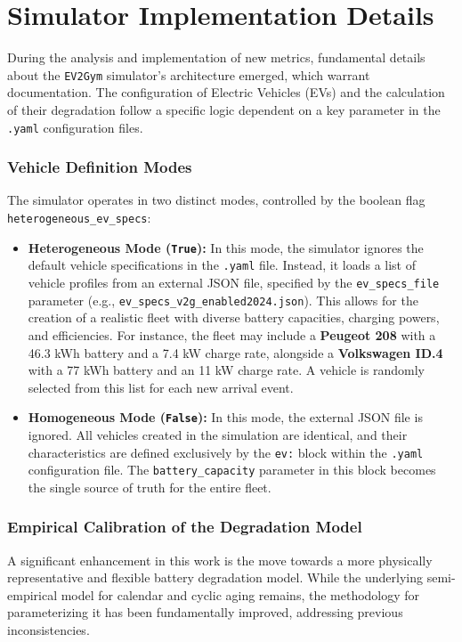 \section{Simulator Implementation Details}
\label{sec:sim_architecture}
During the analysis and implementation of new metrics, fundamental details about the \texttt{EV2Gym} simulator's architecture emerged, which warrant documentation. The configuration of Electric Vehicles (EVs) and the calculation of their degradation follow a specific logic dependent on a key parameter in the \texttt{.yaml} configuration files.

\subsubsection{Vehicle Definition Modes}
The simulator operates in two distinct modes, controlled by the boolean flag \texttt{heterogeneous\_ev\_specs}:
\begin{itemize}
    \item \textbf{Heterogeneous Mode (\texttt{True}):} In this mode, the simulator ignores the default vehicle specifications in the \texttt{.yaml} file. Instead, it loads a list of vehicle profiles from an external JSON file, specified by the \texttt{ev\_specs\_file} parameter (e.g., \texttt{ev\_specs\_v2g\_enabled2024.json}). This allows for the creation of a realistic fleet with diverse battery capacities, charging powers, and efficiencies. For instance, the fleet may include a \textbf{Peugeot 208} with a 46.3 kWh battery and a 7.4 kW charge rate, alongside a \textbf{Volkswagen ID.4} with a 77 kWh battery and an 11 kW charge rate. A vehicle is randomly selected from this list for each new arrival event.
    \item \textbf{Homogeneous Mode (\texttt{False}):} In this mode, the external JSON file is ignored. All vehicles created in the simulation are identical, and their characteristics are defined exclusively by the \texttt{ev:} block within the \texttt{.yaml} configuration file. The \texttt{battery\_capacity} parameter in this block becomes the single source of truth for the entire fleet.
\end{itemize}

\subsubsection{Empirical Calibration of the Degradation Model}
A significant enhancement in this work is the move towards a more physically representative and flexible battery degradation model. While the underlying semi-empirical model for calendar and cyclic aging remains, the methodology for parameterizing it has been fundamentally improved, addressing previous inconsistencies.

